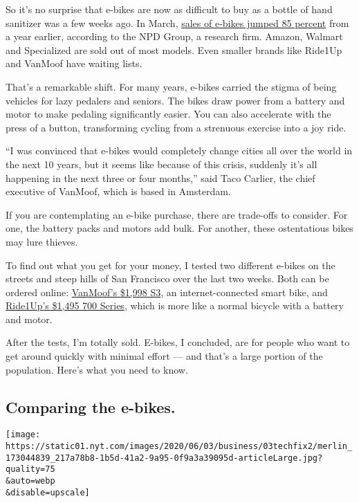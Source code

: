 So it's no surprise that e-bikes are now as difficult to buy as a bottle
of hand sanitizer was a few weeks ago. In March,
\href{https://www.nytimes.com/2020/05/18/nyregion/bike-shortage-coronavirus.html}{sales
of e-bikes jumped 85 percent} from a year earlier, according to the NPD
Group, a research firm. Amazon, Walmart and Specialized are sold out of
most models. Even smaller brands like Ride1Up and VanMoof have waiting
lists.

That's a remarkable shift. For many years, e-bikes carried the stigma of
being vehicles for lazy pedalers and seniors. The bikes draw power from
a battery and motor to make pedaling significantly easier. You can also
accelerate with the press of a button, transforming cycling from a
strenuous exercise into a joy ride.

``I was convinced that e-bikes would completely change cities all over
the world in the next 10 years, but it seems like because of this
crisis, suddenly it's all happening in the next three or four months,''
said Taco Carlier, the chief executive of VanMoof, which is based in
Amsterdam.

If you are contemplating an e-bike purchase, there are trade-offs to
consider. For one, the battery packs and motors add bulk. For another,
these ostentatious bikes may lure thieves.

To find out what you get for your money, I tested two different e-bikes
on the streets and steep hills of San Francisco over the last two weeks.
Both can be ordered online:
\href{https://www.vanmoof.com/en-US}{VanMoof's \$1,998 S3}, an
internet-connected smart bike, and
\href{https://ride1up.com/product/700-series/}{Ride1Up's \$1,495 700
Series}, which is more like a normal bicycle with a battery and motor.

After the tests, I'm totally sold. E-bikes, I concluded, are for people
who want to get around quickly with minimal effort --- and that's a
large portion of the population. Here's what you need to know.

\hypertarget{comparing-the-e-bikes}{%
\subsection{Comparing the e-bikes.}\label{comparing-the-e-bikes}}

\texttt{[image: https://static01.nyt.com/images/2020/06/03/business/03techfix2/merlin\_173044839\_217a78b8-1b5d-41a2-9a95-0f9a3a39095d-articleLarge.jpg?quality=75\\\&auto=webp\\\&disable=upscale]}

